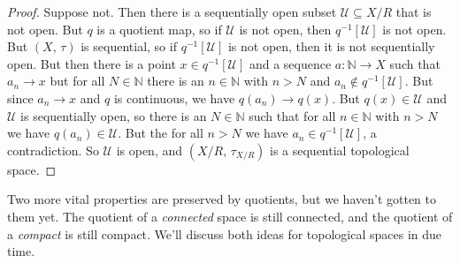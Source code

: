 \documentclass{article}
\theoremstyle{plain}
\theoremstyle{normal}
\begin{document}
        \begin{proof}
            Suppose not. Then there is a sequentially open subset
            $\mathcal{U}\subseteq{X}/R$ that is not open. But $q$ is a
            quotient map, so if $\mathcal{U}$ is not open, then
            $q^{-1}[\mathcal{U}]$ is not open. But $(X,\,\tau)$ is sequential,
            so if $q^{-1}[\mathcal{U}]$ is not open, then it is not
            sequentially open. But then there is a point
            $x\in{q}^{-1}[\mathcal{U}]$ and a sequence
            $a:\mathbb{N}\rightarrow{X}$ such that $a_{n}\rightarrow{x}$ but
            for all $N\in\mathbb{N}$ there is an $n\in\mathbb{N}$ with $n>N$
            and $a_{n}\notin{q}^{-1}[\mathcal{U}]$. But since
            $a_{n}\rightarrow{x}$ and $q$ is continuous, we have
            $q(a_{n})\rightarrow{q}(x)$. But $q(x)\in\mathcal{U}$ and
            $\mathcal{U}$ is sequentially open, so there is an
            $N\in\mathbb{N}$ such that for all $n\in\mathbb{N}$ with $n>N$
            we have $q(a_{n})\in\mathcal{U}$. But the for all $n>N$ we have
            $a_{n}\in{q}^{-1}[\mathcal{U}]$, a contradiction. So
            $\mathcal{U}$ is open, and $(X/R,\,\tau_{X/R})$ is a
            sequential topological space.
        \end{proof}
        Two more vital properties are preserved by quotients, but we haven't
        gotten to them yet. The quotient of a \textit{connected} space is still
        connected, and the quotient of a \textit{compact} is still compact.
        We'll discuss both ideas for topological spaces in due time.
\end{document}

